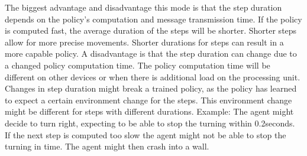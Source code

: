 The biggest advantage and disadvantage this mode is that the step duration depends on the policy's computation and message transmission time. If the policy is computed fast, the average duration of the steps will be shorter. Shorter steps allow for more precise movements. Shorter durations for steps can result in a more capable policy.
A disadvantage is that the step duration can change due to a changed policy computation time. The policy computation time will be different on other devices or when there is additional load on the processing unit.
Changes in step duration might break a trained policy, as the policy has learned to expect a certain environment change for the steps. This environment change might be different for steps with different durations. 
Example: The agent might decide to turn right, expecting to be able to stop the turning within 0.2seconds. If the next step is computed too slow the agent might not be able to stop the turning in time. The agent might then crash into a wall.


\usetikzlibrary{decorations.pathreplacing}
\newcommand\offset{-3}

